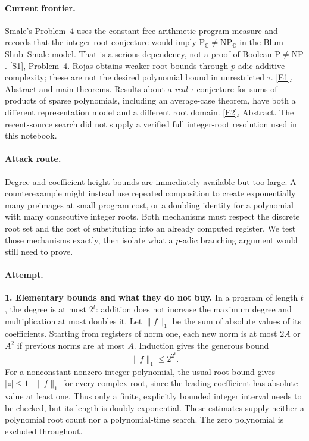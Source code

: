 \documentclass[11pt,a4paper]{article}
\newcommand{\C}{\mathbb{C}}
\newcommand{\sref}[2]{\hyperlink{source:#1:#2}{[S#2]}}
\newcommand{\eref}[2]{\hyperlink{extra:#1:#2}{[E#2]}}
\numberwithin{equation}{section}
\begin{document}
\paragraph{Current frontier.}
Smale's Problem~4 uses the constant-free arithmetic-program measure and
records that the integer-root conjecture would imply
$\mathrm P_{\C}\ne\mathrm{NP}_{\C}$ in the Blum--Shub--Smale model.
That is a serious dependency, not a proof of Boolean $\mathrm P\ne
\mathrm{NP}$. \sref{20002353}{1}, Problem~4.
Rojas obtains weaker root bounds through $p$-adic additive complexity;
these are not the desired polynomial bound in unrestricted $\tau$.
\eref{20002353}{1}, Abstract and main theorems. Results about a \emph{real}
$\tau$ conjecture for sums of products of sparse polynomials, including
an average-case theorem, have both a different representation model and
a different root domain. \eref{20002353}{2}, Abstract.
The recent-source search did not supply a verified full integer-root
resolution used in this notebook.

\paragraph{Attack route.}
Degree and coefficient-height bounds are immediately available but too
large. A counterexample might instead use repeated composition to create
exponentially many preimages at small program cost, or a doubling identity
for a polynomial with many consecutive integer roots. Both mechanisms
must respect the discrete root set and the cost of substituting into an
already computed register. We test those mechanisms exactly, then isolate
what a $p$-adic branching argument would still need to prove.

\paragraph{Attempt.}
\textbf{1. Elementary bounds and what they do not buy.}
In a program of length $t$, the degree is at most $2^t$: addition does
not increase the maximum degree and multiplication at most doubles it.
Let $\|f\|_1$ be the sum of absolute values of its coefficients. Starting
from registers of norm one, each new norm is at most $2A$ or $A^2$ if
previous norms are at most $A$. Induction gives the generous bound
\[
 \|f\|_1\le 2^{2^t}.
\]
For a nonconstant nonzero integer polynomial, the usual root bound gives
$|z|\le1+\|f\|_1$ for every complex root, since the leading coefficient
has absolute value at least one. Thus only a finite, explicitly bounded
integer interval needs to be checked, but its length is doubly
exponential. These estimates supply neither a polynomial root count nor
a polynomial-time search. The zero polynomial is excluded throughout.
\end{document}
